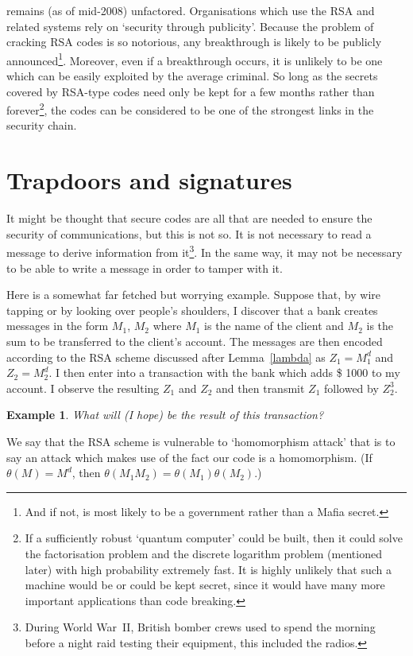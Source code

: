 \documentclass[12pt,a4paper]{article}
\theoremstyle{plain}
\newtheorem{example}[theorem]{Example}
\theoremstyle{definition}
\begin{document}
remains (as of mid-2008) unfactored.
Organisations which use the RSA and related systems
rely on `security through publicity'. Because
the problem of cracking RSA codes is so notorious,
any breakthrough is likely to be publicly
announced\footnote{And if not, is most likely
to be a government rather than a Mafia secret.}.
Moreover, even if a breakthrough occurs, it
is unlikely to be one which can be easily
exploited by the average criminal. So long
as the secrets covered by RSA-type codes
need only be kept for a few months rather
than forever\footnote{If a sufficiently robust
`quantum computer' could be built, then
it could solve the factorisation problem
and the discrete logarithm problem
(mentioned later) with high probability
extremely fast. It is highly unlikely
that such a machine would be or could be
kept secret, since it would have many more
important applications than
code breaking.}, the codes can be considered
to be one of the strongest links in the
security chain.
\section{Trapdoors and signatures}\label{trapdoors}
It might be thought that secure codes
are all that are needed to ensure
the security of communications,
but this is not so. It is not necessary
to read a message to derive information
from it\footnote{During World War~II,
British bomber crews used to spend the morning
before a night raid testing their equipment,
this included the radios.}. In the same way,
it may not be necessary to be able to
write a message in order to tamper with it.

Here is a somewhat far fetched but worrying example.
Suppose that, by wire tapping or by looking over
people's shoulders, I discover that a bank
creates messages in the form $M_{1}$, $M_{2}$
where $M_{1}$ is the name of the client
and $M_{2}$ is the sum to be transferred
to the client's account.
The messages are then encoded
according to the RSA scheme discussed after Lemma~\ref{lambda}
as $Z_{1}=M_{1}^{d}$ and $Z_{2}=M_{2}^{d}$. I then
enter into a transaction with the bank
which adds \$ 1000  to my account.
I observe the resulting $Z_{1}$ and $Z_{2}$
and then transmit $Z_{1}$ followed by $Z_{2}^{3}$.
\begin{example} What will (I hope) be the result
of this transaction?
\end{example}
\noindent
We say that the RSA scheme is vulnerable to
`homomorphism attack' that is to say an attack
which makes use of the fact our code is a homomorphism.
(If $\theta(M)=M^{d}$, then 
$\theta(M_{1}M_{2})=\theta(M_{1})\theta(M_{2})$.)
\end{document}

